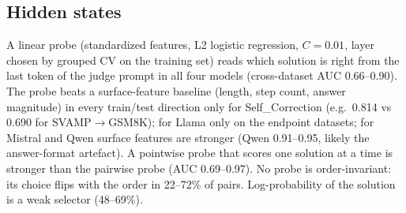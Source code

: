 \documentclass[11pt]{article}
\begin{document}
\begin{table}[t]
\centering\small
\caption{Single-order vs order-averaged verdict accuracy (\texttt{base\_c} log-probabilities), same scale as
\citet{ren2023selfeval}. Gain with 95\% CI.}
\label{tab:ren}
\end{table}

\subsection{Hidden states}
A linear probe (standardized features, L2 logistic regression, $C=0.01$, layer chosen by grouped CV on the
training set) reads which solution is right from the last token of the judge prompt in all four models
(cross-dataset AUC 0.66--0.90). The probe beats a surface-feature baseline (length, step count, answer
magnitude) in every train/test direction only for Self\_Correction (e.g.\ 0.814 vs 0.690 for SVAMP$\to$GSM8K);
for Llama only on the endpoint datasets; for Mistral and Qwen surface features are stronger (Qwen 0.91--0.95,
likely the answer-format artefact). A pointwise probe that scores one solution at a time is stronger than the
pairwise probe (AUC 0.69--0.97). No probe is order-invariant: its choice flips with the order in 22--72\% of
pairs. Log-probability of the solution is a weak selector (48--69\%).
\end{document}
